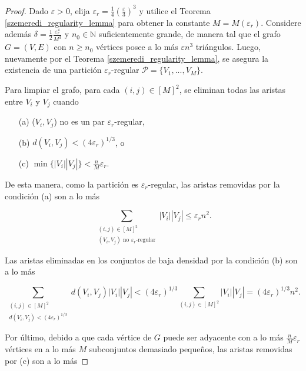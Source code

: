 \documentclass{article}[14pts]
\let\varepsilon=\varepsilon
\begin{document}
\begin{proof}

    Dado $\varepsilon > 0$, elija $\varepsilon_r = \frac{1}{4}\left(  \frac{\varepsilon}{3}\right)^{3}$ y  utilice el Teorema \ref{szemeredi_regularity_lemma} para obtener la constante $M=M(\varepsilon_r)$. Considere además $\delta = \frac{1}{2}\frac{\varepsilon_{r}^{4}}{M^{3}}$ y $n_0\in\mathbb{N}$ suficientemente grande, de manera tal que el grafo $G = (V,E)$ con $n\geq n_0$ vértices posee a lo más $\varepsilon n^{3}$ triángulos. Luego, nuevamente por el Teorema \ref{szemeredi_regularity_lemma}, se asegura la existencia de una partición $\varepsilon_r$-regular $\mathcal{P} = \lbrace V_1,...,V_M \rbrace$.\medskip

    Para limpiar el grafo, para cada $(i,j)\in [M]^{2}$, se eliminan todas las aristas entre $V_i$ y $V_j$ cuando\medskip
    
    \begin{itemize}
        \item[(a)] ($V_i , V_j$) no es un par $\varepsilon_r$-regular,
        \item[(b)] $d(V_i, V_j) < (4\varepsilon_r)^{1/3}$, o
        \item[(c)] $\min\lbrace |V_i||V_j|\rbrace < \frac{n}{M}\varepsilon_r$.
    \end{itemize}\medskip

    De esta manera, como la partición es $\varepsilon_r$-regular, las aristas removidas por la condición (a) son a lo más\medskip
    
    \begin{equation*}
        \sum_{\substack{(i,j)\in [M]^{2} \\ (V_i , V_j) \text{ no } \varepsilon_r\text{-regular}}} |V_i||V_j|\leq \varepsilon_r n^{2}.
    \end{equation*}\medskip

    Las aristas eliminadas en los conjuntos de baja densidad por la condición (b) son a lo más\medskip

    \begin{equation*}
        \sum_{\substack{(i,j)\in [M]^{2} \\ d(V_i, V_j) < (4\varepsilon_r)^{1/3}}} d(V_i, V_j)|V_i||V_j| < (4\varepsilon_r)^{1/3} \sum_{(i,j)\in [M]^{2}} |V_i||V_j| = (4\varepsilon_r)^{1/3} n^{2}.
    \end{equation*}\medskip

    Por último, debido a que cada vértice de $G$ puede ser adyacente con a lo más $\frac{n}{M}\varepsilon_r$ vértices en a lo más $M$ subconjuntos demasiado pequeños, las aristas removidas por (c) son a lo más\medskip


\end{proof}
\end{document}
